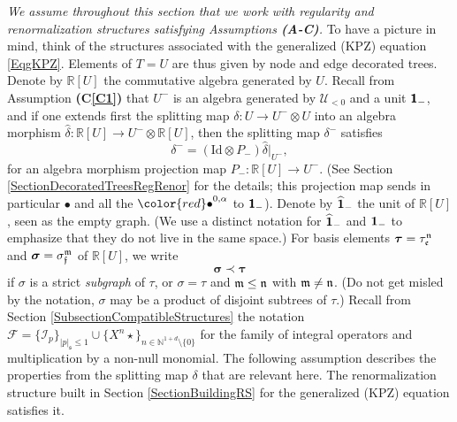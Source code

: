 \documentclass[10pt, reqno]{amsart}
\numberwithin{subsection}{section}
\numberwithin{subsubsection}{subsection}
\numberwithin{equation}{section} %
\theoremstyle{mystyle}
\theoremstyle{mystyle2}
\theoremstyle{mystyle3}
\newcommand{\refC}[1]{\textbf{\textsf{(C\ref{#1})}}}
\newcommand{\mcF}{\boldsymbol{p}}
\newcommand{\bstau}{\boldsymbol{\tau}}
\newcommand{\bssigma}{\boldsymbol{\sigma}}
\newcommand{\mfs}{\mathfrak{s}}
\newcommand\bbN{\mathbb{N}}
\newcommand\bbR{\mathbb{R}}
\renewcommand{\mcF}{\mathcal{F}}
\newcommand{\mcI}{\mathcal{I}}
\newcommand\mcU{\mathcal U}
\begin{document}
{\it We assume throughout this section that we work with regularity and renormalization structures satisfying Assumptions \textbf{\textsf{(A-C)}}.} To have a picture in mind, think of the structures associated with the generalized (KPZ) equation \eqref{EqgKPZ}. Elements of $T=U$ are thus given by node and edge decorated trees. Denote by $\bbR[U]$ the commutative algebra generated by $U$. Recall from Assumption \refC{C1} that $U^-$ is an algebra generated by $\mcU_{<0}$ and a unit $\textbf{\textsf{1}}_-$, and if one extends first the splitting map $\delta:U\to U^-\otimes U$ into an algebra morphism $\hat\delta : \bbR[U]\to U^-\otimes\bbR[U]$, then the splitting map $\delta^-$ satisfies
$$
\delta^- = (\textrm{Id}\otimes P_-){\widehat\delta}\vert_{U^-},
$$
for an algebra morphism projection map $P_- : \mathbb{R}[U]\rightarrow U^-$. (See Section \ref{SectionDecoratedTreesRegRenor} for the details; this projection map sends in particular $\bullet$ and all the ${\color{red} \bullet}^{0,\alpha}$ to $\textbf{\textsf{1}}_-$). Denote by {\color{red}$\widehat{\bf1}_{-}$} the unit of $\mathbb{R}[U]$, seen as the empty graph. (We use a distinct notation for {\color{red}$\widehat{\bf1}_{-}$} and ${\bf1}_-$ to emphasize that they do not live in the same space.) For basis elements $\bstau=\tau_{\frak{e}}^{\frak{n}}$ and $\bssigma=\sigma_{\frak{f}}^\frak{m}$ of $\bbR[U]$, we write
$$
\bssigma\prec\bstau
$$
if $\sigma$ is a strict {\it subgraph} of $\tau$, or $\sigma=\tau$ and $\frak{m}\leq \frak{n}$ with $\frak{m}\neq\frak{n}$. (Do not get misled by the notation, $\sigma$ may be a product of disjoint subtrees of $\tau$.) Recall from Section \ref{SubsectionCompatibleStructures} the notation $\mcF=\{\mcI_p\}_{|p|_\mfs\le1}\cup\{X^n\star\}_{n\in\bbN^{1+d}\setminus\{0\}}$ for the family of integral operators and multiplication by a non-null monomial. The following assumption describes the properties from the splitting map $\delta$ that are relevant here. The renormalization structure built in Section \ref{SectionBuildingRS} for the generalized (KPZ) equation satisfies it.


\medskip
\end{document}
